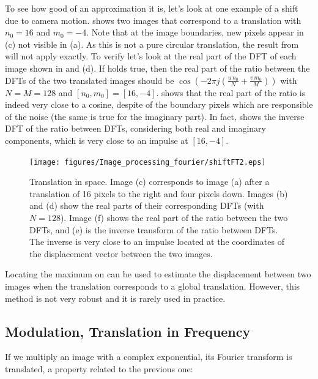 To see how good of an approximation it is, let's look at one example of a shift due to camera motion. \Fig{\ref{fig:shiftFT}} shows two images that correspond to a translation with $n_0=16$ and $m_0=-4$. Note that at the image boundaries, new pixels appear in (c) not visible in (a). As this is not a pure circular translation, the result from \eqn{\ref{eq:shift}} will not apply exactly. To verify \eqn{\ref{eq:shift}} let's look at the real part of the DFT of each image shown in  and (d). If \eqn{\ref{eq:shift}} holds true, then the real part of the ratio between the DFTs of the two translated images should be $\cos{ \left( -2\pi j \left( \frac{u\, n_0}{N} + \frac{v\, m_0}{M} \right) \right)}$ with $N=M=128$ and $[n_0,m_0]=[16,-4]$.   shows that the real part of the ratio is indeed very close to a cosine, despite of the boundary pixels which are responsible of the noise (the same is true for the imaginary part). In fact,   shows the inverse DFT of the ratio between DFTs, considering both real and imaginary components, which is very close to an impulse at $[16,-4]$.



\begin{figure}[t]
	\centerline{
		\texttt{[image: figures/Image\_processing\_fourier/shiftFT2.eps]}}
	\caption{Translation in space. Image (c) corresponds to image (a) after a translation of 16 pixels to the right and four pixels down. Images (b) and (d) show the real parts of their corresponding DFTs (with $N=128$). Image (f) shows the real part of the ratio between the two DFTs, and (e) is the inverse transform of the ratio between DFTs. The inverse is very close to an impulse located at the coordinates of the displacement vector between the two images.}
	\label{fig:shiftFT}
\end{figure}

Locating the maximum on  can be used to estimate the displacement between two images when the translation corresponds to a global translation. However, this method is not very robust and it is rarely used in practice.


\subsection{Modulation, Translation in Frequency}

If we multiply an image with a complex exponential, its Fourier transform is translated, a property related to the previous one:

